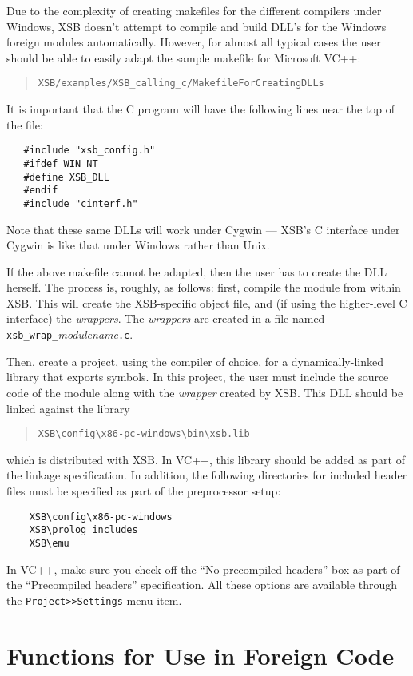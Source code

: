 Due to the complexity of creating makefiles for the different compilers
under Windows, XSB doesn't attempt to compile and build DLL's for the
Windows foreign modules automatically. However, for almost all typical
cases the user should be able to easily adapt the sample makefile for
Microsoft VC++:
\begin{quote}
 {\tt XSB/examples/XSB\_calling\_c/MakefileForCreatingDLLs}
\end{quote}
It is important that the C program will have the following lines near the
top of the file:
\begin{verbatim}
   #include "xsb_config.h"  
   #ifdef WIN_NT
   #define XSB_DLL
   #endif
   #include "cinterf.h"
\end{verbatim}

Note that these same DLLs will work under Cygwin --- XSB's C interface
under Cygwin is like that under Windows rather than Unix.


If the above makefile cannot be adapted, then the user has to create
the DLL herself.  The process is, roughly, as follows: first, compile
the module from within XSB.  This will create the XSB-specific object
file, and (if using the higher-level C interface) the
\emph{wrappers}. The \emph{wrappers} are created in a file named
\texttt{xsb\_wrap\_}\emph{modulename}\texttt{.c}.

Then, create a project, using the compiler of choice, for a
dynamically-linked library that exports symbols. In this project, the
user must include the source code of the module along with the
\emph{wrapper} created by XSB. This DLL should be linked against the
library
\begin{quote}
   \verb|XSB\config\x86-pc-windows\bin\xsb.lib|
\end{quote}
which is distributed with XSB. In VC++, this library should be added 
as part of the linkage specification. In addition, the following
directories for included header files must be specified as part of the
preprocessor setup:
\begin{verbatim}
    XSB\config\x86-pc-windows
    XSB\prolog_includes
    XSB\emu
\end{verbatim}
In VC++, make sure you check off the ``No precompiled headers'' box as part
of the ``Precompiled headers'' specification. All these options are
available through the {\tt Project>>Settings} menu item.

\section{Functions for Use in Foreign Code}


